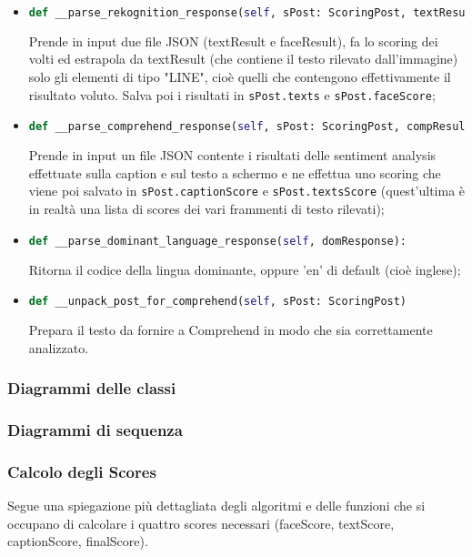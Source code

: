 \begin{itemize}
\item 
\begin{lstlisting}[language=Python, numbers=none]
def __parse_rekognition_response(self, sPost: ScoringPost, textResult, faceResult):
\end{lstlisting}
Prende in input due file JSON (textResult e faceResult), fa lo scoring dei volti ed estrapola 
da textResult (che contiene il testo rilevato dall'immagine) solo gli elementi di tipo "LINE", 
cioè quelli che contengono effettivamente il risultato voluto.
Salva poi i risultati in \verb+sPost.texts+ e \verb+sPost.faceScore+;

\item 
\begin{lstlisting}[language=Python, numbers=none]
def __parse_comprehend_response(self, sPost: ScoringPost, compResult):
\end{lstlisting}
Prende in input un file JSON contente i risultati delle sentiment analysis effettuate 
sulla caption e sul testo a schermo e ne effettua uno scoring che viene poi salvato 
in \verb+sPost.captionScore+ e \verb+sPost.textsScore+ (quest'ultima è in realtà una lista 
di scores dei vari frammenti di testo rilevati);

\item 
\begin{lstlisting}[language=Python, numbers=none]
def __parse_dominant_language_response(self, domResponse):
\end{lstlisting}
Ritorna il codice della lingua dominante, oppure 'en' di default (cioè inglese);

\item 
\begin{lstlisting}[language=Python, numbers=none]
def __unpack_post_for_comprehend(self, sPost: ScoringPost)
\end{lstlisting}
Prepara il testo da fornire a Comprehend in modo che sia correttamente analizzato.
\end{itemize}

\subsubsection{Diagrammi delle classi}
\subsubsection{Diagrammi di sequenza}
\subsubsection{Calcolo degli Scores}
Segue una spiegazione più dettagliata degli algoritmi e delle funzioni che si occupano di calcolare
i quattro scores necessari (faceScore, textScore, captionScore, finalScore).
